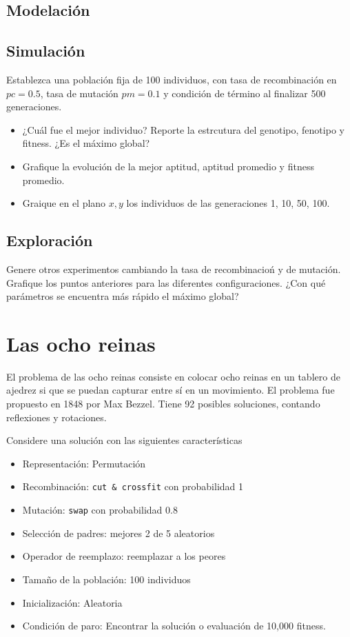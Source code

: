 \documentclass[twocolumn]{article}
\begin{document}
\subsection{Modelación}

\subsection{Simulación}

Establezca una población fija de 100 individuos, con tasa de recombinación en
$pc = 0.5$, tasa de mutación $pm = 0.1$ y condición de término al finalizar 500
generaciones.

\begin{itemize}
  \item ¿Cuál fue el mejor individuo? Reporte la estrcutura del genotipo,
    fenotipo y fitness. ¿Es el máximo global?
  \item Grafique la evolución de la mejor aptitud, aptitud promedio y fitness
    promedio.
  \item Graique en el plano $x, y$ los individuos de las generaciones 1, 10,
    50, 100.
\end{itemize}

\subsection{Exploración}

Genere otros experimentos cambiando la tasa de recombinacioń y de mutación.
Grafique los puntos anteriores para las diferentes configuraciones. ¿Con qué
parámetros se encuentra más rápido el máximo global?

\section{Las ocho reinas}

El problema de las ocho reinas consiste en colocar ocho reinas en un tablero de
ajedrez si que se puedan capturar entre sí en un movimiento. El problema fue
propuesto en 1848 por Max Bezzel. Tiene 92 posibles soluciones, contando
reflexiones y rotaciones.

Considere una solución con las siguientes características

\begin{itemize}
  \item Representación: Permutación
  \item Recombinación: \texttt{cut \& crossfit} con probabilidad 1
  \item Mutación: \texttt{swap} con probabilidad 0.8
  \item Selección de padres: mejores 2 de 5 aleatorios
  \item Operador de reemplazo: reemplazar a los peores
  \item Tamaño de la población: 100 individuos
  \item Inicialización: Aleatoria
  \item Condición de paro: Encontrar la solución o evaluación de 10,000
    fitness.
\end{itemize}
\end{document}

